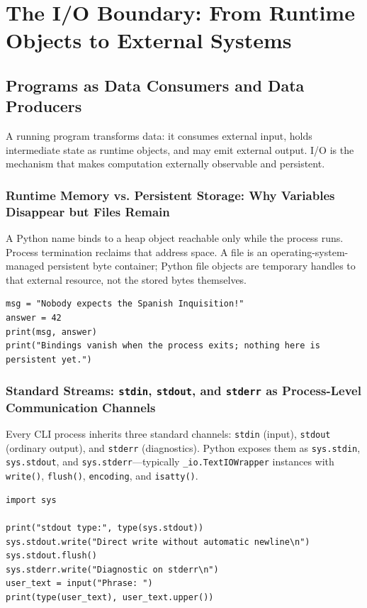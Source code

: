 \section{The I/O Boundary: From Runtime Objects to External Systems}

\subsection{Programs as Data Consumers and Data Producers}

A running program transforms data: it consumes external input, holds intermediate state as runtime objects, and may emit external output. I/O is the mechanism that makes computation externally observable and persistent.

\subsubsection{Runtime Memory vs. Persistent Storage: Why Variables Disappear but Files Remain}

A Python name binds to a heap object reachable only while the process runs. Process termination reclaims that address space. A file is an operating-system-managed persistent byte container; Python file objects are temporary handles to that external resource, not the stored bytes themselves.

\begin{verbatim}
msg = "Nobody expects the Spanish Inquisition!"
answer = 42
print(msg, answer)
print("Bindings vanish when the process exits; nothing here is persistent yet.")
\end{verbatim}

\subsubsection{Standard Streams: \texttt{stdin}, \texttt{stdout}, and \texttt{stderr} as Process-Level Communication Channels}

Every CLI process inherits three standard channels: \texttt{stdin} (input), \texttt{stdout} (ordinary output), and \texttt{stderr} (diagnostics). Python exposes them as \texttt{sys.stdin}, \texttt{sys.stdout}, and \texttt{sys.stderr}---typically \texttt{\_io.TextIOWrapper} instances with \texttt{write()}, \texttt{flush()}, \texttt{encoding}, and \texttt{isatty()}.

\begin{verbatim}
import sys

print("stdout type:", type(sys.stdout))
sys.stdout.write("Direct write without automatic newline\n")
sys.stdout.flush()
sys.stderr.write("Diagnostic on stderr\n")
user_text = input("Phrase: ")
print(type(user_text), user_text.upper())
\end{verbatim}

